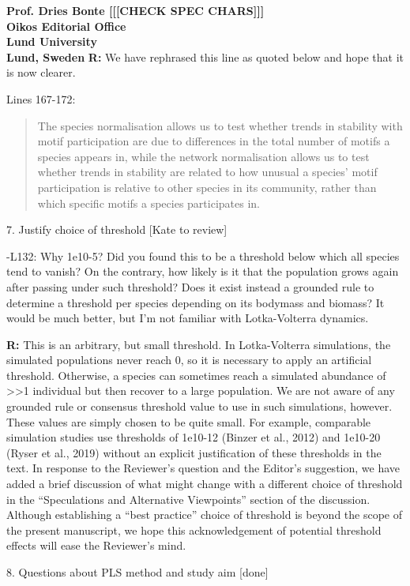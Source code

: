 \documentclass[12pt]{letter}
\begin{document}
\begin{letter}{\bf Prof. Dries Bonte [[[CHECK SPEC CHARS]]]\\
Oikos Editorial Office \\
Lund University \\
Lund, Sweden}
      \textbf{R:} We have rephrased this line as quoted below and hope that it is now clearer.

    
        Lines 167-172:
        
        \begin{quotation}
    		The species normalisation allows us to test whether trends in stability with motif participation are due to differences in the total number of motifs a species appears in, while the network normalisation allows us to test whether trends in stability are related to how unusual a species' motif participation is relative to other species in its community, rather than which specific motifs a species participates in.
        \end{quotation}


    7. Justify choice of threshold [Kate to review]

        -L132: Why 1e10-5? Did you found this to be a threshold below which all species tend to vanish? On the contrary, how likely is it that the population grows again after passing under such threshold? Does it exist instead a grounded rule to determine a threshold per species depending on its bodymass and biomass? It would be much better, but I’m not familiar with Lotka-Volterra dynamics.

        \textbf{R:} This is an arbitrary, but small threshold. In Lotka-Volterra simulations, the simulated populations never reach 0, so it is necessary to apply an artificial threshold. Otherwise, a species can sometimes reach a simulated abundance of >>1 individual but then recover to a large population.
        We are not aware of any grounded rule or consensus threshold value to use in such simulations, however. These values are simply chosen to be quite small. For example, comparable simulation studies use thresholds of 1e10-12 (Binzer et al., 2012) and 1e10-20 (Ryser et al., 2019) without an explicit justification of these thresholds in the text. 
        In response to the Reviewer's question and the Editor's suggestion, we have added a brief discussion of what might change with a different choice of threshold in the ``Speculations and Alternative Viewpoints'' section of the discussion. 
        Although establishing a ``best practice'' choice of threshold is beyond the scope of the present manuscript, we hope this acknowledgement of potential threshold effects will ease the Reviewer's mind.
        

    8. Questions about PLS method and study aim [done]


\end{letter}
\end{document}
